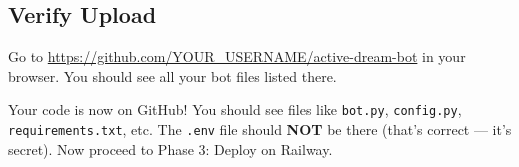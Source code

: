 \subsection{Verify Upload}

Go to \url{https://github.com/YOUR_USERNAME/active-dream-bot} in your browser. You should see all your bot files listed there.

\begin{successbox}
Your code is now on GitHub! You should see files like \texttt{bot.py}, \texttt{config.py}, \texttt{requirements.txt}, etc. The \texttt{.env} file should \textbf{NOT} be there (that's correct --- it's secret). Now proceed to Phase 3: Deploy on Railway.
\end{successbox}
